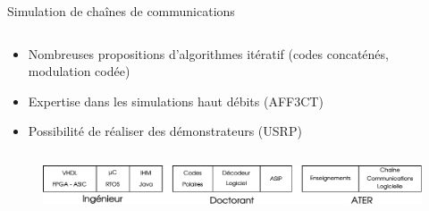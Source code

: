 \documentclass[t,compress,mathserif,12pt,xcolor=dvipsnames]{beamer}
\begin{document}
\begin{frame}[t]{Simulation de chaînes de communications}
  \begin{minipage}[t][5.0cm][t]{\textwidth}
    \begin{columns}
      \begin{column}{0.63\textwidth}
        \vspace{-30pt}
        \begin{itemize}
          \item Nombreuses propositions d'algorithmes itératif (codes concaténés, modulation codée)
          \item Expertise dans les simulations haut débits (AFF3CT)
          \item Possibilité de réaliser des démonstrateurs (USRP)

        \end{itemize}
      \end{column}
      \begin{column}{0.04\textwidth}

      \end{column}
      \begin{column}{0.33\textwidth}
      \end{column}
    \end{columns}
  \end{minipage}
  \begin{figure}[htp]
    \centering
    \includegraphics[width=\textwidth]{fig/frise}
  \end{figure}

\end{frame}
\end{document}
